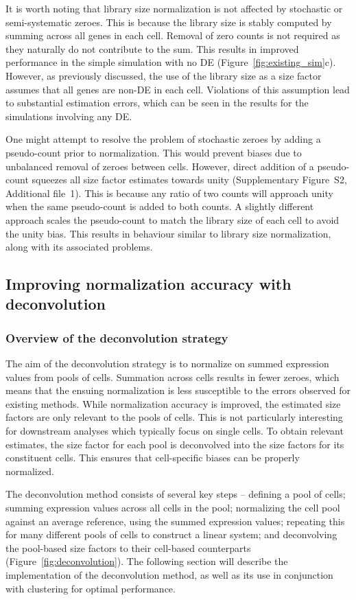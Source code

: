 \documentclass{bmcart}
\newcommand{\supppseudo}{S2}
\begin{document}
It is worth noting that library size normalization is not affected by stochastic or semi-systematic zeroes.
This is because the library size is stably computed by summing across all genes in each cell.
Removal of zero counts is not required as they naturally do not contribute to the sum.
This results in improved performance in the simple simulation with no DE (Figure~\ref{fig:existing_sim}c).
However, as previously discussed, the use of the library size as a size factor assumes that all genes are non-DE in each cell.
Violations of this assumption lead to substantial estimation errors, which can be seen in the results for the simulations involving any DE.

One might attempt to resolve the problem of stochastic zeroes by adding a pseudo-count prior to normalization.
This would prevent biases due to unbalanced removal of zeroes between cells.
However, direct addition of a pseudo-count squeezes all size factor estimates towards unity (Supplementary Figure~\supppseudo{}, Additional file~1).
This is because any ratio of two counts will approach unity when the same pseudo-count is added to both counts.
A slightly different approach scales the pseudo-count to match the library size of each cell to avoid the unity bias.
This results in behaviour similar to library size normalization, along with its associated problems.

\subsection*{Improving normalization accuracy with deconvolution}

\subsubsection*{Overview of the deconvolution strategy}
The aim of the deconvolution strategy is to normalize on summed expression values from pools of cells.
Summation across cells results in fewer zeroes, which means that the ensuing normalization is less susceptible to the errors observed for existing methods.
While normalization accuracy is improved, the estimated size factors are only relevant to the pools of cells.
This is not particularly interesting for downstream analyses which typically focus on single cells.
To obtain relevant estimates, the size factor for each pool is deconvolved into the size factors for its constituent cells.
This ensures that cell-specific biases can be properly normalized.

The deconvolution method consists of several key steps --
    defining a pool of cells;
    summing expression values across all cells in the pool;
    normalizing the cell pool against an average reference, using the summed expression values;
    repeating this for many different pools of cells to construct a linear system;
    and deconvolving the pool-based size factors to their cell-based counterparts (Figure~\ref{fig:deconvolution}).
The following section will describe the implementation of the deconvolution method, as well as its use in conjunction with clustering for optimal performance.
\end{document}

